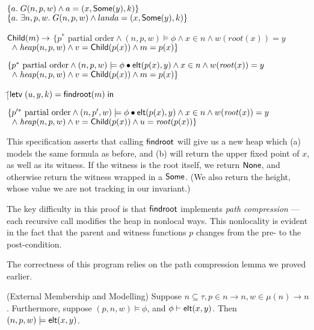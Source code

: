 \begin{specification}
\nextline\> \> $\{a.\;G(n, p, w) \land a = (x, \mathsf{Some}(y), k)\}$
\nextline\> \> $\{a.\;\exists n, p, w.\; G(n, p, w) \land land a = (x, \mathsf{Some}(y), k)\}$

\nextline\> \> $\mathsf{Child}(m) \to$
\nextline\> \> $\{p^{*} \mbox{ partial order} \land (n, p, w) \models \phi \land
             x \in n \land w(\mathit{root}(x)) = y $ 
\nextline\> \> $\;\;\land\; \mathit{heap}(n, p, w) \land v = \mathsf{Child}(p(x)) \land m = p(x) \}$

\nextline\> \> $\{p^{*} \mbox{ partial order} \land (n, p, w) \models \phi\bullet\mathsf{elt}({p(x)}, {y}) \land
             x \in n \land w(\mathit{root}(x)) = y $ 
\nextline\> \> $\;\;\land\; \mathit{heap}(n, p, w) \land v = \mathsf{Child}(p(x)) \land m = p(x) \}$


\nextline\> \> $[$\=$\mathsf{letv}\;(u, y, k) = \mathsf{findroot}(m)\;\mathsf{in}\;$

\nextline\> \> $\{p'^{*} \mbox{ partial order} \land (n, p', w) \models \phi\bullet\mathsf{elt}({p(x)}, {y}) \land
             x \in n \land w(\mathit{root}(x)) = y $ 
\nextline\> \> $\;\;\land\; \mathit{heap}(n, p, w) \land v = \mathsf{Child}(p(x)) \land u = \mathit{root}(p(x)) \}$



\end{specification}




This specification asserts that calling $\mathsf{findroot}$ will give us a new
heap which (a) models the same formula as before, and (b) will return
the upper fixed point of $x$, as well as its witness. If the witness
is the root itself, we return $\mathsf{None}$, and otherwise return the
witness wrapped in a $\mathsf{Some}$. (We also return the height, whose value
we are not tracking in our invariant.)

The key difficulty in this proof is that $\mathsf{findroot}$ implements
\emph{path compression} --- each recursive call modifies the heap in
nonlocal ways. This nonlocality is evident in the fact that the parent
and witness functions $p$ changes from the pre- to the post-condition.

The correctness of this program relies on the path compression lemma
we proved earlier. 





\begin{lemma}{(External Membership and Modelling)}
Suppose $n \subseteq \tau, p \in n \to n, w \in \mu(n) \to n$. Furthermore,
suppose $(p, n, w) \models \phi$, and ${\phi} \vdash \mathsf{elt}({x}, {y})$. 
Then $(n, p, w) \models \mathsf{elt}({x}, {y})$. 
\end{lemma}

